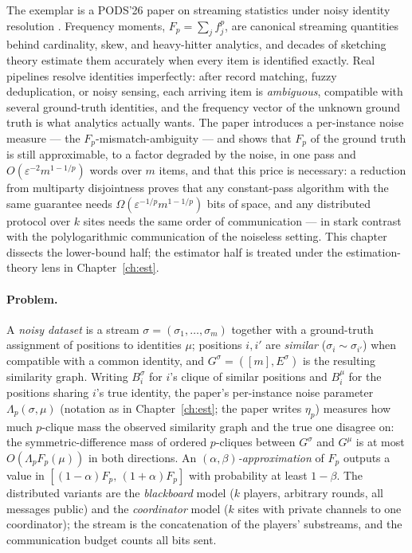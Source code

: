 The exemplar is a PODS'26 paper on streaming statistics under noisy identity
resolution \citep{sigmod26-115}\pods. Frequency moments, $F_p = \sum_j f_j^p$, are
canonical streaming quantities behind cardinality, skew, and heavy-hitter analytics,
and decades of sketching theory estimate them accurately when every item is identified
exactly. Real pipelines resolve identities imperfectly: after record matching, fuzzy
deduplication, or noisy sensing, each arriving item is \emph{ambiguous}, compatible
with several ground-truth identities, and the frequency vector of the unknown ground
truth is what analytics actually wants. The paper introduces a per-instance noise
measure --- the $F_p$-mismatch-ambiguity --- and shows that $F_p$ of the ground truth
is still approximable, to a factor degraded by the noise, in one pass and
$O(\varepsilon^{-2} m^{1-1/p})$ words over $m$ items, and that this price is
necessary: a reduction from multiparty disjointness proves that any constant-pass
algorithm with the same guarantee needs $\Omega(\varepsilon^{-1/p} m^{1-1/p})$ bits of
space, and any distributed protocol over $k$ sites needs the same order of
communication --- in stark contrast with the polylogarithmic communication of the
noiseless setting. This chapter dissects the lower-bound half; the estimator half is
treated under the estimation-theory lens in Chapter~\ref{ch:est}.

\paragraph{Problem.}
A \emph{noisy dataset} is a stream $\sigma = (\sigma_1,\dots,\sigma_m)$ together with a
ground-truth assignment of positions to identities $\mu$; positions $i, i'$ are
\emph{similar} ($\sigma_i \sim \sigma_{i'}$) when compatible with a common identity,
and $G^\sigma = ([m], E^\sigma)$ is the resulting similarity graph. Writing
$B_i^\sigma$ for $i$'s clique of similar positions and $B_i^\mu$ for the positions
sharing $i$'s true identity, the paper's per-instance noise parameter
$\Lambda_p(\sigma,\mu)$ (notation as in Chapter~\ref{ch:est}; the paper writes
$\eta_p$) measures how much $p$-clique mass the observed similarity graph and the true
one disagree on: the symmetric-difference mass of ordered $p$-cliques between
$G^\sigma$ and $G^\mu$ is at most $O(\Lambda_p F_p(\mu))$ in both directions. An
\emph{$(\alpha,\beta)$-approximation} of $F_p$ outputs a value in
$[(1-\alpha)F_p,\,(1+\alpha)F_p]$ with probability at least $1-\beta$. The distributed
variants are the \emph{blackboard} model ($k$ players, arbitrary rounds, all messages
public) and the \emph{coordinator} model ($k$ sites with private channels to one
coordinator); the stream is the concatenation of the players' substreams, and the
communication budget counts all bits sent.

